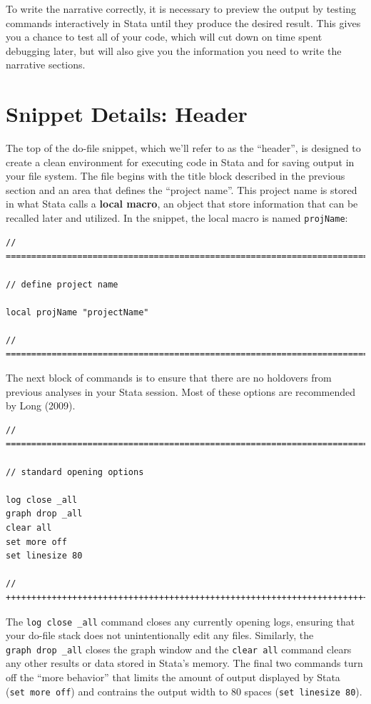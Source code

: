 \documentclass[]{book}
\begin{document}
To write the narrative correctly, it is necessary to preview the output
by testing commands interactively in Stata until they produce the
desired result. This gives you a chance to test all of your code, which
will cut down on time spent debugging later, but will also give you the
information you need to write the narrative sections.

\section{Snippet Details: Header}\label{snippet-details-header}

The top of the do-file snippet, which we'll refer to as the ``header'',
is designed to create a clean environment for executing code in Stata
and for saving output in your file system. The file begins with the
title block described in the previous section and an area that defines
the ``project name''. This project name is stored in what Stata calls a
\textbf{local macro}, an object that store information that can be
recalled later and utilized. In the snippet, the local macro is named
\texttt{projName}:

\begin{verbatim}
// ==========================================================================

// define project name

local projName "projectName"

// ==========================================================================
\end{verbatim}

The next block of commands is to ensure that there are no holdovers from
previous analyses in your Stata session. Most of these options are
recommended by Long (2009).

\begin{verbatim}
// ==========================================================================

// standard opening options

log close _all
graph drop _all
clear all
set more off
set linesize 80

// ++++++++++++++++++++++++++++++++++++++++++++++++++++++++++++++++++++++++++
\end{verbatim}

The \texttt{log\ close\ \_all} command closes any currently opening
logs, ensuring that your do-file stack does not unintentionally edit any
files. Similarly, the \texttt{graph\ drop\ \_all} closes the graph
window and the \texttt{clear\ all} command clears any other results or
data stored in Stata's memory. The final two commands turn off the
``more behavior'' that limits the amount of output displayed by Stata
(\texttt{set\ more\ off}) and contrains the output width to 80 spaces
(\texttt{set\ linesize\ 80}).
\end{document}
